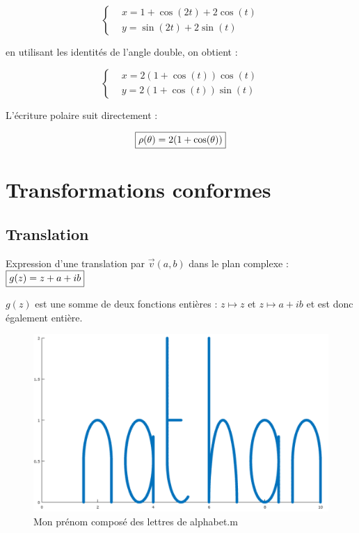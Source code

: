 \documentclass{article}
\begin{document}
        \begin{equation*}
            \left \{
            \begin{aligned}
              &x = 1 + \cos(2t) + 2\cos(t) \\
              &y = \sin(2t) + 2\sin(t)
            \end{aligned} \right.
        \end{equation*} 
        
        en utilisant les identités de l'angle double, on obtient :

        \begin{equation*}
            \left \{
            \begin{aligned}
              &x = 2(1 + \cos(t))\cos(t) \\
              &y = 2(1 + \cos(t))\sin(t)
            \end{aligned} \right.
        \end{equation*}

        L'écriture polaire suit directement : 

        $$\fbox{$\rho(\theta) = 2(1 + \cos(\theta))$}$$

        \section{Transformations conformes}

        \subsection{Translation}

        Expression d'une translation par $\vec{v}(a, b)$ dans le plan complexe : $\fbox{$g(z) = z + a + ib$}$

        $g(z)$ est une somme de deux fonctions entières : $z \mapsto z$ et $z \mapsto a + ib$ et est
        donc également entière.

        \begin{figure}[ht!]
            \centering
            \includegraphics[height=0.3\textwidth]{figures/name.png}
            \caption{Mon prénom composé des lettres de alphabet.m}
          \end{figure}
\end{document}

